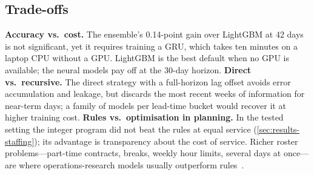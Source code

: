 \documentclass[conference]{IEEEtran}
\begin{document}
\subsection{Trade-offs}
\textbf{Accuracy vs.\ cost.} The ensemble's 0.14-point gain over LightGBM at 42 days is not
significant, yet it requires training a GRU, which takes ten minutes on a laptop CPU without a GPU. LightGBM is the best default
when no GPU is available; the neural models pay off at the 30-day horizon. \textbf{Direct vs.\
recursive.} The direct strategy with a full-horizon lag offset avoids error accumulation and
leakage, but discards the most recent weeks of information for near-term days; a family of models
per lead-time bucket would recover it at higher training cost. \textbf{Rules vs.\ optimisation in
planning.} In the tested setting the integer program did not beat the rules at equal service
(\cref{sec:results-staffing}); its advantage is transparency about the cost of service. Richer roster
problems---part-time contracts, breaks, weekly hour limits, several days at once---are where
operations-research models usually outperform rules~\cite{ernst2004staff}.
\end{document}
